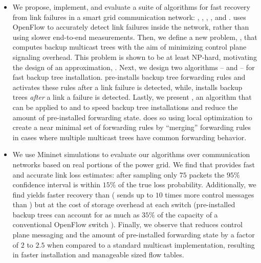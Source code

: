 \begin{itemize}
	\item We propose, implement, and evaluate a suite of algorithms for fast recovery from link failures in a smart grid communication network: \pcnts, \steiners, \pres, \posts, and \merges.
	\pcnt uses OpenFlow to accurately detect link failures inside the network, rather than using slower end-to-end measurements. Then, we define a new problem, \mcs, that computes backup 
	multicast trees with the aim of minimizing control plane signaling overhead. %
	This problem is shown to be at least NP-hard, motivating the design of an approximation, \steiners. 
	Next, we design two algorithms -- \pre and \post -- for fast backup tree installation. \pre pre-installs backup tree forwarding rules and
	activates these rules after a link failure is detected, while, \post installs backup trees \emph{after} a link a failure is detected. 
	Lastly, we present \merges, an algorithm that can be applied to \pre and \post to speed backup tree installations and reduce the amount of pre-installed forwarding state. 
	\merge does so using local optimization to create a near minimal set of forwarding rules by ``merging'' forwarding rules in cases where multiple multicast trees have common forwarding behavior.

	\item 
	We use Mininet \cite{Lantz10} simulations to evaluate our algorithms over communication networks based on real portions of the power grid.
	We find that \pcnt provides fast and accurate link loss estimates: after sampling only $75$ packets
	the $95\%$ confidence interval is within $15\%$ of the true loss probability.  
	Additionally, we find \pre yields faster recovery than \post ( 
	\post sends up to $10$ times more control messages than \pres) but at the cost of storage overhead at each switch (pre-installed backup trees can account for as much
	as $35\%$ of the capacity of a conventional OpenFlow switch \cite{Curtis11}).
	Finally, we observe that \merge reduces control plane messaging and the amount of pre-installed forwarding state by a factor of $2$ to $2.5$ when compared to a standard multicast
	implementation, resulting in faster installation and manageable sized flow tables.






		

\end{itemize}




